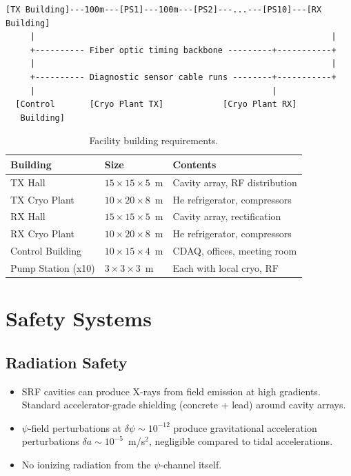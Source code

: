 \documentclass[11pt,letterpaper]{article}
\begin{document}
\begin{verbatim}
[TX Building]---100m---[PS1]---100m---[PS2]---...---[PS10]---[RX Building]
     |                                                            |
     +---------- Fiber optic timing backbone ---------+-----------+
     |                                                            |
     +---------- Diagnostic sensor cable runs --------+-----------+
     |                                                |
  [Control       [Cryo Plant TX]            [Cryo Plant RX]
   Building]
\end{verbatim}

\begin{table}[H]
\caption{Facility building requirements.}
\begin{tabular}{lll}
\toprule
Building & Size & Contents \\
\midrule
TX Hall & $15 \times 15 \times 5$~m & Cavity array, RF distribution \\
TX Cryo Plant & $10 \times 20 \times 8$~m & He refrigerator, compressors \\
RX Hall & $15 \times 15 \times 5$~m & Cavity array, rectification \\
RX Cryo Plant & $10 \times 20 \times 8$~m & He refrigerator, compressors \\
Control Building & $10 \times 15 \times 4$~m & CDAQ, offices, meeting room \\
Pump Station (x10) & $3 \times 3 \times 3$~m & Each with local cryo, RF \\
\bottomrule
\end{tabular}
\end{table}

\section{Safety Systems}

\subsection{Radiation Safety}

\begin{itemize}
\item SRF cavities can produce X-rays from field emission at high
gradients. Standard accelerator-grade shielding (concrete + lead)
around cavity arrays.
\item $\psi$-field perturbations at $\delta\psi \sim 10^{-12}$ produce
gravitational acceleration perturbations $\delta a \sim 10^{-5}$~m/s$^2$,
negligible compared to tidal accelerations.
\item No ionizing radiation from the $\psi$-channel itself.
\end{itemize}
\end{document}
